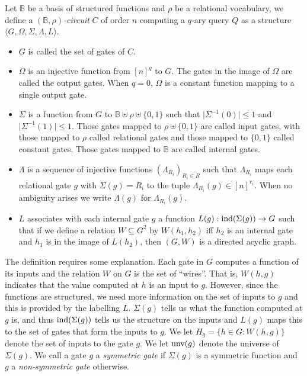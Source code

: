 \documentclass[a4paper,UKenglish]{lipics-v2018}
\begin{document}
\begin{definition}
  Let $\mathbb{B}$ be a basis of structured functions and $\rho$ be a relational
  vocabulary, we define a \emph{$(\mathbb{B}, \rho)$-circuit} $C$ of order $n$
  computing a $q$-ary query $Q$ as a structure $\langle G, \Omega, \Sigma,
  \Lambda, L \rangle$.
  \begin{itemize}
    \setlength\itemsep{0mm}
  \item $G$ is called the set of gates of
    $C$.%
  \item $\Omega$ is an injective function from $[n]^q$ to $G$. The gates in the
    image of $\Omega$ are called the output gates. When $q = 0$, $\Omega$ is a
    constant function mapping to a single output gate.
  \item $\Sigma$ is a function from $G$ to $\mathbb{B} \uplus \rho \uplus
    \{0,1\} $ such that $\vert \Sigma^{-1} (0) \vert \leq 1$ and $\vert
    \Sigma^{-1} (1) \vert \leq 1$. Those gates mapped to $\rho \uplus \{0,1\}$
    are called input gates, with those mapped to $\rho$ called relational gates
    and those mapped to $\{0,1\}$ called constant gates. Those gates mapped to
    $\mathbb{B}$ are called internal gates.
  \item $\Lambda$ is a sequence of injective functions $(\Lambda_{R_i})_{R_i \in
      R}$ such that $\Lambda_{R_i}$ maps each relational gate $g$ with $\Sigma
    (g) = R_i$ to the tuple $\Lambda_{R_i} (g) \in [n]^{r_i}$. When no ambiguity
    arises we write $\Lambda (g)$ for $\Lambda_{R_i} (g)$.
  \item $L$ associates with each internal gate $g$ a function $L(g):
    \text{\upshape ind}(\Sigma(g)) \rightarrow G$ such that if we define a relation $W
    \subseteq G^{2}$ by $W(h_1,h_2)$ iff $h_2$ is an internal gate and $h_1$ is
    in the image of $L(h_2)$, then $(G, W)$ is a %
    directed acyclic graph.
  \end{itemize}
\end{definition}

The definition requires some explanation. Each gate in $G$ computes a function
of its inputs and the relation $W$ on $G$ is the set of ``wires''. That is,
$W(h,g)$ indicates that the value computed at $h$ is an input to $g$. However,
since the functions are structured, we need more information on the set of
inputs to $g$ and this is provided by the labelling $L$. $\Sigma(g)$ tells us
what the function computed at $g$ is, and thus $\text{\upshape ind}(\Sigma(g))$ tells us the
structure on the inputs and $L(g)$ maps this to the set of gates that form the
inputs to $g$. We let $H_g = \{h \in G : W(h,g)\}$ denote the set of inputs to
the gate $g$. We let $\text{unv}(g)$ denote the universe of $\Sigma(g)$. We call
a gate $g$ a \emph{symmetric gate} if $\Sigma(g)$ is a symmetric function and
$g$ a \emph{non-symmetric gate} otherwise.
\end{document}
